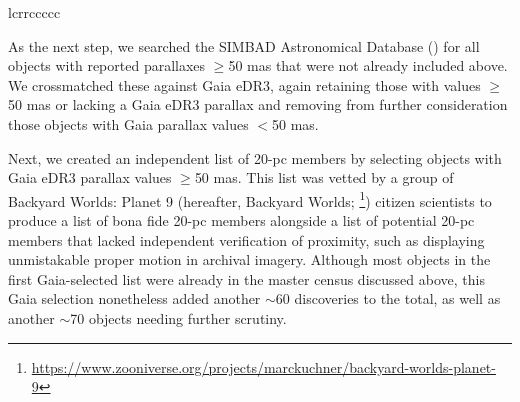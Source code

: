 \documentclass[twocolumn,tighten,twocolappendix]{aastex631}
\begin{document}
\begin{deluxetable*}{lcrrccccc}
\end{deluxetable*}

As the next step, we searched the SIMBAD Astronomical Database (\citealt{wenger2000}) for all objects with reported parallaxes $\ge$50 mas that were not already included above. We crossmatched these against Gaia eDR3, again retaining those with values $\ge$50 mas or lacking a Gaia eDR3 parallax and removing from further consideration those objects with Gaia parallax values $<$50 mas.  

Next, we created an independent list of 20-pc members by selecting objects with Gaia eDR3 parallax values $\ge$50 mas. This list was vetted by a group of Backyard Worlds: Planet 9 (hereafter, Backyard Worlds; \citealt{kuchner2017}\footnote{\url {https://www.zooniverse.org/projects/marckuchner/backyard-worlds-planet-9}}) citizen scientists to produce a list of bona fide 20-pc members alongside a list of potential 20-pc members that lacked independent verification of proximity, such as displaying unmistakable proper motion in archival imagery. Although most objects in the first Gaia-selected list were already in the master census discussed above, this Gaia selection nonetheless added another $\sim$60 discoveries to the total, as well as another $\sim$70 objects needing further scrutiny.
\end{document}

